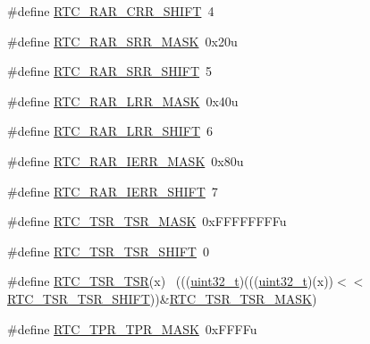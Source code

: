 \begin{DoxyCompactItemize}
\item 
\#define \hyperlink{group___r_t_c___register___masks_gab184f1269ead4310ffb856ec7fb43171}{R\+T\+C\+\_\+\+R\+A\+R\+\_\+\+C\+R\+R\+\_\+\+S\+H\+I\+FT}~4
\item 
\#define \hyperlink{group___r_t_c___register___masks_gae53f1b7345f96a9c760070c09cb681d9}{R\+T\+C\+\_\+\+R\+A\+R\+\_\+\+S\+R\+R\+\_\+\+M\+A\+SK}~0x20u
\item 
\#define \hyperlink{group___r_t_c___register___masks_ga23133dd504a3ee1f1e44adb432cb961a}{R\+T\+C\+\_\+\+R\+A\+R\+\_\+\+S\+R\+R\+\_\+\+S\+H\+I\+FT}~5
\item 
\#define \hyperlink{group___r_t_c___register___masks_ga3ff3b63507d843cbf0c4738aea636510}{R\+T\+C\+\_\+\+R\+A\+R\+\_\+\+L\+R\+R\+\_\+\+M\+A\+SK}~0x40u
\item 
\#define \hyperlink{group___r_t_c___register___masks_gab21813ba6c73f55e69563b0fcfbd0d73}{R\+T\+C\+\_\+\+R\+A\+R\+\_\+\+L\+R\+R\+\_\+\+S\+H\+I\+FT}~6
\item 
\#define \hyperlink{group___r_t_c___register___masks_ga000c148fd3ee9bfbe8f5a96edb4f395d}{R\+T\+C\+\_\+\+R\+A\+R\+\_\+\+I\+E\+R\+R\+\_\+\+M\+A\+SK}~0x80u
\item 
\#define \hyperlink{group___r_t_c___register___masks_gaf3ac1fe81dcd5b54cfe9d8d2125345aa}{R\+T\+C\+\_\+\+R\+A\+R\+\_\+\+I\+E\+R\+R\+\_\+\+S\+H\+I\+FT}~7
\item 
\#define \hyperlink{group___r_t_c___register___masks_ga9a0f8842e8262ca176fcf028982153af}{R\+T\+C\+\_\+\+T\+S\+R\+\_\+\+T\+S\+R\+\_\+\+M\+A\+SK}~0x\+F\+F\+F\+F\+F\+F\+F\+Fu
\item 
\#define \hyperlink{group___r_t_c___register___masks_gad0476d1e39a866b5b5ba4728b55e258a}{R\+T\+C\+\_\+\+T\+S\+R\+\_\+\+T\+S\+R\+\_\+\+S\+H\+I\+FT}~0
\item 
\#define \hyperlink{group___r_t_c___register___masks_ga77fdb2a31f6b8644e3784f5cd65bb52b}{R\+T\+C\+\_\+\+T\+S\+R\+\_\+\+T\+SR}(x)                                                  ~(((\hyperlink{_p_e___types_8h_a33594304e786b158f3fb30289278f5af}{uint32\+\_\+t})(((\hyperlink{_p_e___types_8h_a33594304e786b158f3fb30289278f5af}{uint32\+\_\+t})(x))$<$$<$\hyperlink{group___r_t_c___register___masks_gad0476d1e39a866b5b5ba4728b55e258a}{R\+T\+C\+\_\+\+T\+S\+R\+\_\+\+T\+S\+R\+\_\+\+S\+H\+I\+FT}))\&\hyperlink{group___r_t_c___register___masks_ga9a0f8842e8262ca176fcf028982153af}{R\+T\+C\+\_\+\+T\+S\+R\+\_\+\+T\+S\+R\+\_\+\+M\+A\+SK})
\item 
\#define \hyperlink{group___r_t_c___register___masks_ga2682f687fa561be2f002fc574d48cc79}{R\+T\+C\+\_\+\+T\+P\+R\+\_\+\+T\+P\+R\+\_\+\+M\+A\+SK}~0x\+F\+F\+F\+Fu
$$
\end{DoxyCompactItemize}

